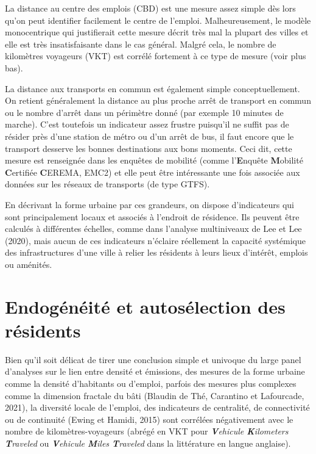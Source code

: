 \documentclass[
  9pt,
  a4paper,
  DIV=11]{scrreprt}
\begin{document}
La distance au centre des emplois (CBD) est une mesure assez simple dès
lors qu'on peut identifier facilement le centre de l'emploi.
Malheureusement, le modèle monocentrique qui justifierait cette mesure
décrit très mal la plupart des villes et elle est très insatisfaisante
dans le cas général. Malgré cela, le nombre de kilomètres voyageurs
(VKT) est corrélé fortement à ce type de mesure (voir plus bas).

La distance aux transports en commun est également simple
conceptuellement. On retient généralement la distance au plus proche
arrêt de transport en commun ou le nombre d'arrêt dans un périmètre
donné (par exemple 10 minutes de marche). C'est toutefois un indicateur
assez frustre puisqu'il ne suffit pas de résider près d'une station de
métro ou d'un arrêt de bus, il faut encore que le transport desserve les
bonnes destinations aux bons moments. Ceci dit, cette mesure est
renseignée dans les enquêtes de mobilité (comme l'\textbf{E}nquête
\textbf{M}obilité \textbf{C}ertifiée \textbf{C}EREMA, EMC2) et elle peut
être intéressante une fois associée aux données sur les réseaux de
transports (de type GTFS).

En décrivant la forme urbaine par ces grandeurs, on dispose
d'indicateurs qui sont principalement locaux et associés à l'endroit de
résidence. Ils peuvent être calculés à différentes échelles, comme dans
l'analyse multiniveaux de Lee et Lee (2020), mais aucun de ces
indicateurs n'éclaire réellement la capacité systémique des
infrastructures d'une ville à relier les résidents à leurs lieux
d'intérêt, emplois ou aménités.

\section{Endogénéité et autosélection des
résidents}\label{endoguxe9nuxe9ituxe9-et-autosuxe9lection-des-ruxe9sidents}

Bien qu'il soit délicat de tirer une conclusion simple et univoque du
large panel d'analyses sur le lien entre densité et émissions, des
mesures de la forme urbaine comme la densité d'habitants ou d'emploi,
parfois des mesures plus complexes comme la dimension fractale du bâti
(Blaudin de Thé, Carantino et Lafourcade, 2021), la diversité locale de
l'emploi, des indicateurs de centralité, de connectivité ou de
continuité (Ewing et Hamidi, 2015) sont corrélées négativement avec le
nombre de kilomètres-voyageurs (abrégé en VKT pour
\emph{\textbf{V}ehicule \textbf{K}ilometers \textbf{T}raveled} ou
\emph{\textbf{V}ehicule \textbf{M}iles \textbf{T}raveled} dans la
littérature en langue anglaise).
\end{document}
